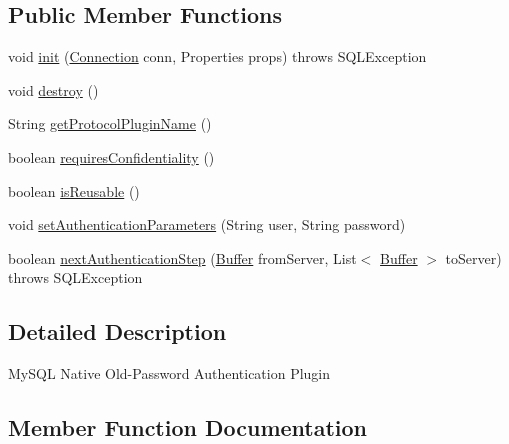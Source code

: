 \subsection*{Public Member Functions}
\begin{DoxyCompactItemize}
\item 
void \mbox{\hyperlink{classcom_1_1mysql_1_1jdbc_1_1authentication_1_1_mysql_old_password_plugin_a4549e60d640445edacfe7187c2e619ef}{init}} (\mbox{\hyperlink{interfacecom_1_1mysql_1_1jdbc_1_1_connection}{Connection}} conn, Properties props)  throws S\+Q\+L\+Exception 
\item 
void \mbox{\hyperlink{classcom_1_1mysql_1_1jdbc_1_1authentication_1_1_mysql_old_password_plugin_a7c2e5445a60764bfa522fb3f99d9d85b}{destroy}} ()
\item 
String \mbox{\hyperlink{classcom_1_1mysql_1_1jdbc_1_1authentication_1_1_mysql_old_password_plugin_a06ca40d8d34e31a0c20b7c22b7ceec78}{get\+Protocol\+Plugin\+Name}} ()
\item 
boolean \mbox{\hyperlink{classcom_1_1mysql_1_1jdbc_1_1authentication_1_1_mysql_old_password_plugin_a463ee44670a3d8d6dc9558e0c027cd99}{requires\+Confidentiality}} ()
\item 
boolean \mbox{\hyperlink{classcom_1_1mysql_1_1jdbc_1_1authentication_1_1_mysql_old_password_plugin_a66202ca57be0da786649bf07b3ea75d2}{is\+Reusable}} ()
\item 
void \mbox{\hyperlink{classcom_1_1mysql_1_1jdbc_1_1authentication_1_1_mysql_old_password_plugin_a744eb8f01ec58474ea3a0d9ed5007531}{set\+Authentication\+Parameters}} (String user, String password)
\item 
boolean \mbox{\hyperlink{classcom_1_1mysql_1_1jdbc_1_1authentication_1_1_mysql_old_password_plugin_a0a1725f9a449c72b77a493bce2d57bdd}{next\+Authentication\+Step}} (\mbox{\hyperlink{classcom_1_1mysql_1_1jdbc_1_1_buffer}{Buffer}} from\+Server, List$<$ \mbox{\hyperlink{classcom_1_1mysql_1_1jdbc_1_1_buffer}{Buffer}} $>$ to\+Server)  throws S\+Q\+L\+Exception 
\end{DoxyCompactItemize}


\subsection{Detailed Description}
My\+S\+QL Native Old-\/\+Password Authentication Plugin 

\subsection{Member Function Documentation}
\mbox{\label{classcom_1_1mysql_1_1jdbc_1_1authentication_1_1_mysql_old_password_plugin_a7c2e5445a60764bfa522fb3f99d9d85b}} 
